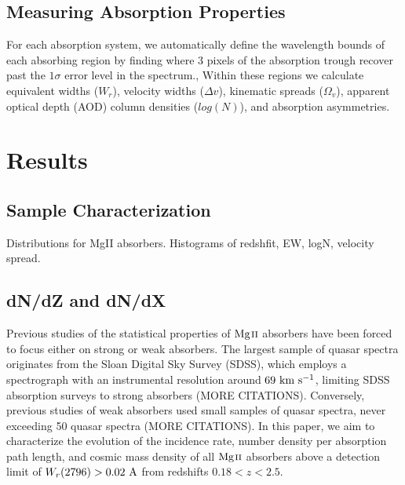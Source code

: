 \documentclass[iop,apj,numberedappendix,appendixfloats,twocolappendix]{emulateapj}
\begin{document}
\subsection{Measuring Absorption Properties}
\label{sec:measuring}

For each absorption system, we automatically define the wavelength bounds of each absorbing region by finding where 3 pixels of the absorption trough recover past the $1\sigma$ error level in the spectrum., Within these regions we calculate equivalent widths ($W_r$), velocity widths ($\Delta v$), kinematic spreads ($\Omega_v$), apparent optical depth (AOD) column densities ($log(N)$), and absorption asymmetries. 



\section{Results}
\label{sec:results}

\subsection{Sample Characterization}
\label{sec:sample}


Distributions for MgII absorbers. Histograms of redshfit, EW, logN, velocity spread.

\subsection{dN/dZ and dN/dX}
\label{dndzdndx}

Previous studies of the statistical properties of ${\hbox{{\rm Mg}\kern 0.1em{\sc ii}}}$ absorbers have been forced to focus either on strong or weak absorbers. The largest sample of quasar spectra originates from the Sloan Digital Sky Survey (SDSS), which employs a spectrograph with an instrumental resolution around $69~\hbox{km~s$^{-1}$}$, limiting SDSS absorption surveys to strong absorbers \citep{Zhu2013,Cooksey2013} (MORE CITATIONS). Conversely, previous studies of weak absorbers used small samples of quasar spectra, never exceeding 50 quasar spectra \citep{Kacprzak2011} (MORE CITATIONS). In this paper, we aim to characterize the evolution of the incidence rate, number density per absorption path length, and cosmic mass density of all ${\hbox{{\rm Mg}\kern 0.1em{\sc ii}}}$ absorbers above a detection limit of $W_r(2796) > 0.02~\mathrm{\AA}$ from redshifts $0.18 < z < 2.5$.
\end{document}
